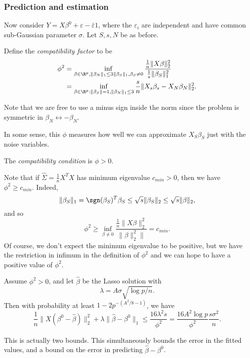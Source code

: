 \documentclass[a4paper]{article}
\begin{document}
\subsubsection*{Prediction and estimation}
Now consider $Y = X \beta^0 + \varepsilon - \bar{\varepsilon} 1$, where the $\varepsilon_i$ are independent and have common sub-Gaussian parameter $\sigma$. Let $S, s, N$  be as before.

\begin{defi}
  Define the \emph{compatibility factor} to be
  \begin{align*}
    \phi^2 &= \inf_{\beta \in \R^p, \|\beta_N\|_1 \leq 3 \|\beta_S\|_1, \beta_S \not= 0} \frac{\frac{1}{n} \|X \beta\|_2^2}{ \frac{1}{s} \|\beta_S\|^2_1}\\
    &= \inf_{\beta \in \R^p: \|\beta_S\| = 1, \|\beta_N\|_1 \leq 3} \frac{s}{n} \|X_s \beta_s - X_N \beta_N\|_2^2.
  \end{align*}
\end{defi}
Note that we are free to use a minus sign inside the norm since the problem is symmetric in $\beta_N \leftrightarrow -\beta_N$.

In some sense, this $\phi$ measures how well we can approximate $X_S \beta_S$ just with the noise variables.
\begin{defi}
  The \emph{compatibility condition} is $\phi > 0$.
\end{defi}

Note that if $\hat{\Sigma} = \frac{1}{n} X^T X$ has minimum eigenvalue $c_{min} > 0$, then we have $\phi^2 \geq c_{min}$. Indeed,
\[
  \|\beta_S\|_1 = \sgn (\beta_S)^T \beta_S \leq \sqrt{s} \|\beta_S\|_2 \leq \sqrt{s} \|\beta\|_2,
\]
and so
\[
  \phi^2 \geq \inf_{\beta \not= 0} \frac{\frac{1}{n} \|X \beta\|_2^2}{\|\beta\|_2^2\|} = c_{min}.
\]
Of course, we don't expect the minimum eigenvalue to be positive, but we have the restriction in infimum in the definition of $\phi^2$ and we can hope to have a positive value of $\phi^2$.

\begin{thm}
  Assume $\phi^2 > 0$, and let $\hat{\beta}$ be the Lasso solution with
  \[
    \lambda = A \sigma \sqrt{\log p/n}.
  \]
  Then with probability at least $1 - 2p^{-(A^2/8 - 1)}$, we have
  \[
    \frac{1}{n} \|X (\beta^0 - \hat{\beta})\|_2^2 + \lambda\|\hat{\beta} - \beta^0\|_1 \leq \frac{16 \lambda^2 s}{\phi^2} = \frac{16 A^2 \log p}{\phi^2} \frac{s \sigma^2}{n}.
  \]
\end{thm}
This is actually two bounds. This simultaneously bounds the error in the fitted values, and a bound on the error in predicting $\hat{\beta} - \beta^0$.
\end{document}
